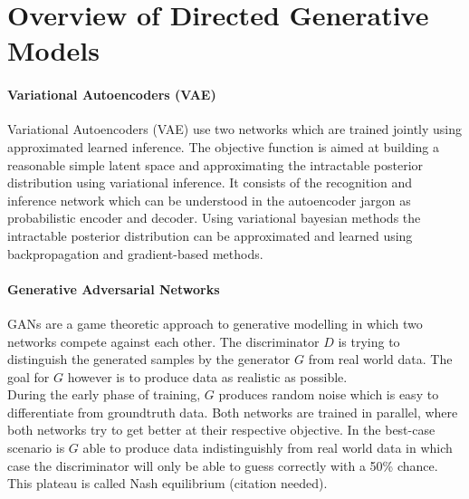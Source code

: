 \section{Overview of Directed Generative Models}
\label{sec:overview}


\paragraph{Variational Autoencoders (VAE) \cite{vae:2013}\cite{rezende:2014}}
\label{par:overview_vae}
Variational Autoencoders (VAE) use two networks which are trained jointly using approximated learned inference.
The objective function is aimed at building a reasonable simple latent space and approximating the intractable posterior distribution using variational inference.
It consists of the recognition and inference network which can be understood in the autoencoder jargon as probabilistic encoder and decoder.
Using variational bayesian methods the intractable posterior distribution can be approximated and learned using backpropagation and gradient-based methods.








\paragraph{Generative Adversarial Networks\cite{gan:2014}}
\label{par:overview_gan}
GANs are a game theoretic approach to generative modelling
in which two networks compete against each other.
The discriminator $D$ is trying to distinguish the generated samples
by the generator $G$ from real world data.
The goal for $G$ however is to produce data as realistic as possible.\\
During the early phase of training, $G$ produces random noise which
is easy to differentiate from groundtruth data.
Both networks are trained in parallel, where both networks try to get better
at their respective objective.
In the best-case scenario is $G$ able to produce data indistinguishly from real world data in which
case the discriminator will only be able to guess correctly with a 50\% chance.
This plateau is called Nash equilibrium (citation needed).




